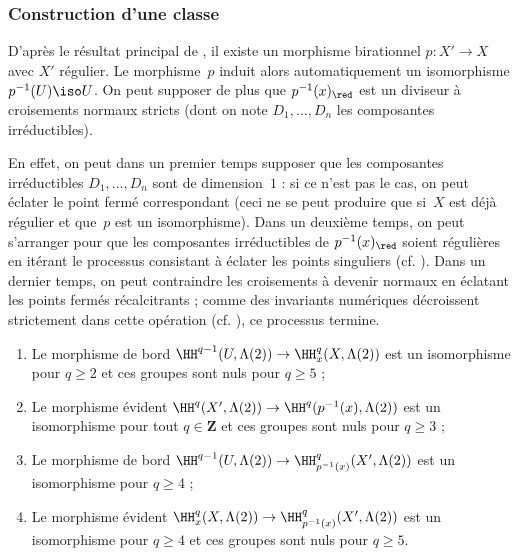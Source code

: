 \documentclass[10pt]{../fichiers-configuration-latex/smfart}
\begin{document}
\subsubsection{Construction d'une classe}%
\label{17-subsubsection-classe-construction}

D'après le résultat principal de 
\cite{D2DS@Lipman}, il existe un morphisme birationnel $p\colon X'\to X$ avec
$X'$ régulier. Le morphisme $p$ induit alors automatiquement un
isomorphisme $p^{-1}(U)\iso U$. On peut
supposer de plus que $p^{-1}(x)_{\red}$ est un diviseur à croisements
normaux stricts (dont on note $D_1,\dots,D_n$ les composantes irréductibles).

En effet, on peut dans un premier temps supposer que les composantes
irréductibles $D_1,\dots,D_n$ sont de dimension~$1$ : si ce n'est pas le
cas, on peut éclater le point fermé correspondant (ceci ne se peut produire
que si $X$ est déjà régulier et que $p$ est un isomorphisme). Dans un
deuxième temps, on peut s'arranger pour que les composantes irréductibles
de $p^{-1}(x)_{\red}$ soient régulières en itérant le processus consistant
à éclater les points singuliers (cf. \cite[page~38]{TIFR@Shafarevich}). Dans un
dernier temps, on peut contraindre les croisements à devenir normaux en
éclatant les points fermés récalcitrants ; comme des invariants numériques
décroissent strictement dans cette opération (cf.
\cite[page~21]{TIFR@Shafarevich}), ce processus termine.

\begin{proposition3}\label{17-proposition-classe-sorites}
\begin{enumerate}
\item[(a)] Le morphisme de bord $\HH^{q-1}(U,\Lambda(2))\to
\HH^q_x(X,\Lambda(2))$ est un isomorphisme pour $q\geq 2$ et ces groupes sont
nuls pour $q\geq 5$ ;
\item[(b)] Le morphisme évident $\HH^q(X',\Lambda(2))\to
\HH^q(p^{-1}(x),\Lambda(2))$ est un isomorphisme pour tout $q\in\mathbf{Z}$
et ces groupes sont nuls pour $q\geq 3$ ;
\item[(c)] Le morphisme de bord $\HH^{q-1}(U,\Lambda(2))\to
\HH^q_{p^{-1}(x)}(X',\Lambda(2))$ est un isomorphisme pour $q\geq 4$ ;
\item[(d)] Le morphisme évident $\HH^q_x(X,\Lambda(2))\to
\HH^q_{p^{-1}(x)}(X',\Lambda(2))$ est un isomorphisme pour $q\geq 4$ et ces
groupes sont nuls pour $q\geq 5$.
\end{enumerate}
\end{proposition3}
\end{document}
